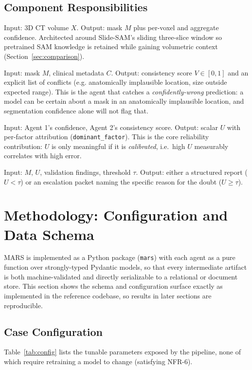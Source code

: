 \documentclass[11pt,a4paper]{article}
\begin{document}
\subsection{Component Responsibilities}
\begin{description}[leftmargin=1.6em, style=nextline]
\item[Agent 1 --- Segmentation] Input: 3D CT volume $X$. Output: mask $M$ plus per-voxel and aggregate confidence. Architected around Slide-SAM's sliding three-slice window so pretrained SAM knowledge is retained while gaining volumetric context (Section~\ref{sec:comparison}).
\item[Agent 2 --- Validation] Input: mask $M$, clinical metadata $C$. Output: consistency score $V \in [0,1]$ and an explicit list of conflicts (e.g. anatomically implausible location, size outside expected range). This is the agent that catches a \emph{confidently-wrong} prediction: a model can be certain about a mask in an anatomically implausible location, and segmentation confidence alone will not flag that.
\item[Agent 3 --- Uncertainty] Input: Agent 1's confidence, Agent 2's consistency score. Output: scalar $U$ with per-factor attribution (\texttt{dominant\_factor}). This is the core reliability contribution: $U$ is only meaningful if it is \emph{calibrated}, i.e.\ high $U$ measurably correlates with high error.
\item[Agent 4 --- Reporting / Routing] Input: $M$, $U$, validation findings, threshold $\tau$. Output: either a structured report ($U < \tau$) or an escalation packet naming the specific reason for the doubt ($U \geq \tau$).
\end{description}

\section{Methodology: Configuration and Data Schema}
\label{sec:methodology}

MARS is implemented as a Python package (\texttt{mars}) with each agent as a pure function over strongly-typed Pydantic models, so that every intermediate artifact is both machine-validated and directly serializable to a relational or document store. This section shows the schema and configuration surface exactly as implemented in the reference codebase, so results in later sections are reproducible.

\subsection{Case Configuration}
Table~\ref{tab:config} lists the tunable parameters exposed by the pipeline, none of which require retraining a model to change (satisfying NFR-6).
\end{document}
